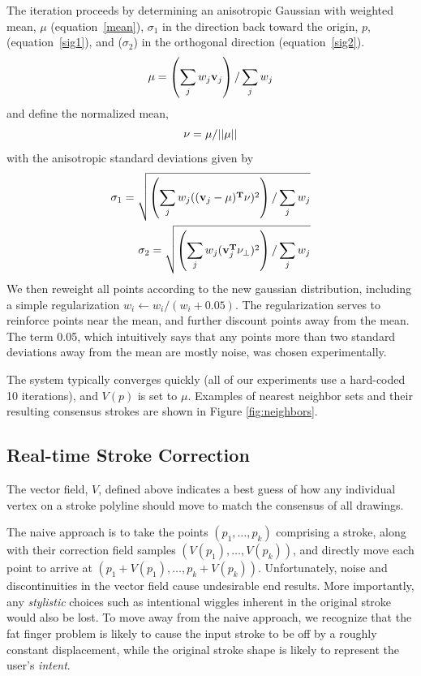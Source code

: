The iteration proceeds by determining an anisotropic Gaussian with weighted mean, $\mu$ (equation~\ref{mean}),
$\sigma_1$ in the direction back toward the origin, $p$, (equation~\ref{sig1}), and ($\sigma_2$) in the orthogonal direction (equation~\ref{sig2}).
\begin{equation}
{\bf \mu} = \left(\sum_j w_j {\bf v}_j\right) / \sum_j w_j  \label{mean}
\end{equation}
and define the normalized mean,
\begin{equation}
{\bf \nu} = \mu/||\mu||
\end{equation}
with the anisotropic standard deviations given by
\begin{eqnarray}
\sigma_1 =  \sqrt{\left(\sum_j w_j (({\bf v}_j-\mu)^{\bf T}\nu)^2\right) / \sum_j w_j} \label{sig1}\\
\sigma_2 =  \sqrt{\left(\sum_j w_j ({\bf v}_j^{\bf T}\nu_\perp)^2\right) / \sum_j w_j} \label{sig2}
\end{eqnarray}
We then reweight all points according to the new gaussian distribution, including a simple regularization $w_i \leftarrow w_i/ (w_i+0.05)$.  The regularization serves to reinforce points near the mean, and further discount points away from the mean. The term 0.05, which intuitively says that any points more than two standard deviations away from the mean are mostly noise, was chosen experimentally.

The system typically converges quickly (all of our experiments use a hard-coded 10 iterations), and $V(p)$ is set to $\mu$.  Examples of nearest neighbor sets and their resulting consensus strokes are shown in Figure \ref{fig:neighbors}.

\subsection{Real-time Stroke Correction}


The vector field, $V$, defined above indicates a best guess of how any individual vertex on a stroke polyline should move to match the consensus of all drawings.

The naive approach is to take the points $(p_1, \ldots, p_k)$ comprising a stroke, along with their correction field samples $(V(p_1), \ldots, V(p_k))$, and directly move each point to arrive at $(p_1 + V(p_1), \ldots, p_k + V(p_k))$.  Unfortunately, noise and discontinuities in the vector field cause undesirable end results. More importantly, any {\em stylistic} choices such as intentional wiggles inherent in the original stroke would also be lost.  To move away from the naive approach, we recognize that the fat finger problem is likely to cause the input stroke to be off by a roughly constant displacement, while the original stroke shape is likely to represent the user's {\em intent}.

